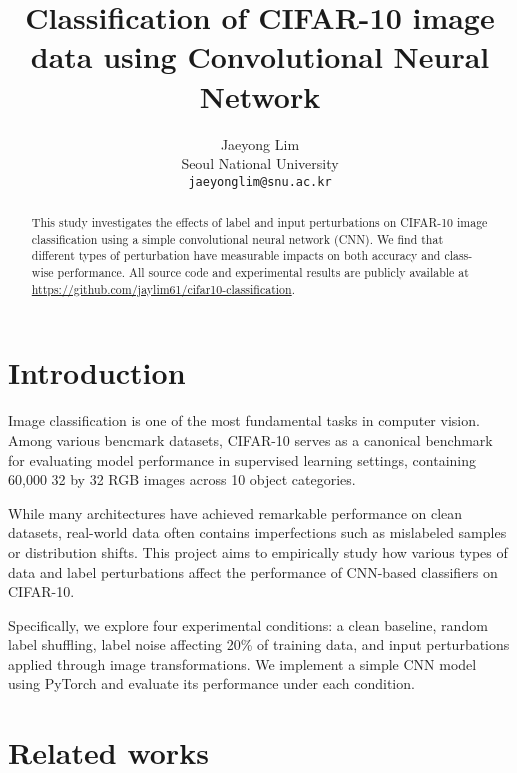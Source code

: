 \documentclass[10pt,twocolumn,letterpaper]{article}
\begin{document}
\title{Classification of CIFAR-10 image data using Convolutional Neural Network}

\author{Jaeyong Lim\\
Seoul National University\\
{\tt\small jaeyonglim@snu.ac.kr}}
\maketitle

\begin{abstract}
   This study investigates the effects of label and input perturbations on CIFAR-10 image classification using a simple convolutional neural network (CNN). We find that different types of perturbation have measurable impacts on both accuracy and class-wise performance. All source code and experimental results are publicly available at \url{https://github.com/jaylim61/cifar10-classification}.
\end{abstract}

\section{Introduction}
\label{sec:intro}

Image classification is one of the most fundamental tasks in computer vision. Among various bencmark datasets, CIFAR-10 serves as a canonical benchmark for evaluating model performance in supervised learning settings, containing 60,000 32 by 32 RGB images across 10 object categories.

While many architectures have achieved remarkable performance on clean datasets, real-world data often contains imperfections such as mislabeled samples or distribution shifts. This project aims to empirically study how various types of data and label perturbations affect the performance of CNN-based classifiers on CIFAR-10.

Specifically, we explore four experimental conditions: a clean baseline, random label shuffling, label noise affecting 20\% of training data, and input perturbations applied through image transformations. We implement a simple CNN model using PyTorch and evaluate its performance under each condition.

\section{Related works}
\label{sec:related_works}
\end{document}
